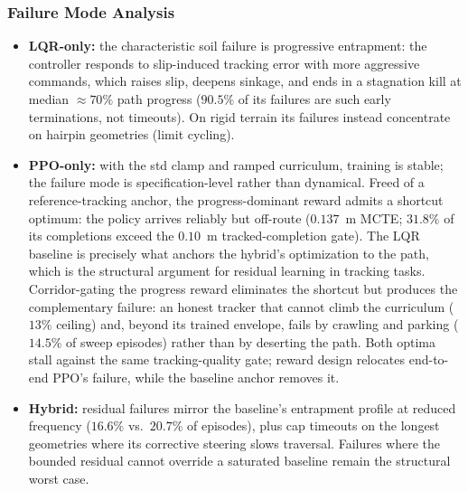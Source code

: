 \documentclass[conference]{IEEEtran}
\begin{document}
\subsubsection{Failure Mode Analysis}
\begin{itemize}
\item \textbf{LQR-only:} the characteristic soil failure is progressive entrapment: the controller responds to slip-induced tracking error with more aggressive commands, which raises slip, deepens sinkage, and ends in a stagnation kill at median $\approx\!70\%$ path progress ($90.5\%$ of its failures are such early terminations, not timeouts). On rigid terrain its failures instead concentrate on hairpin geometries (limit cycling).
\item \textbf{PPO-only:} with the std clamp and ramped curriculum, training is stable; the failure mode is specification-level rather than dynamical. Freed of a reference-tracking anchor, the progress-dominant reward admits a shortcut optimum: the policy arrives reliably but off-route ($0.137$~m MCTE; $31.8\%$ of its completions exceed the $0.10$~m tracked-completion gate). The LQR baseline is precisely what anchors the hybrid's optimization to the path, which is the structural argument for residual learning in tracking tasks. Corridor-gating the progress reward eliminates the shortcut but produces the complementary failure: an honest tracker that cannot climb the curriculum ($13\%$ ceiling) and, beyond its trained envelope, fails by crawling and parking ($14.5\%$ of sweep episodes) rather than by deserting the path. Both optima stall against the same tracking-quality gate; reward design relocates end-to-end PPO's failure, while the baseline anchor removes it.
\item \textbf{Hybrid:} residual failures mirror the baseline's entrapment profile at reduced frequency ($16.6\%$ vs.\ $20.7\%$ of episodes), plus cap timeouts on the longest geometries where its corrective steering slows traversal. Failures where the bounded residual cannot override a saturated baseline remain the structural worst case.
\end{itemize}
\end{document}
